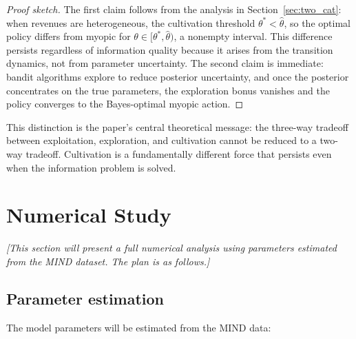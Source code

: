 \documentclass[11pt]{article}
\begin{document}
\begin{proof}[Proof sketch]
The first claim follows from the analysis in Section~\ref{sec:two_cat}: when revenues are heterogeneous, the cultivation threshold $\theta^* < \hat{\theta}$, so the optimal policy differs from myopic for $\theta \in [\theta^*, \hat{\theta})$, a nonempty interval. This difference persists regardless of information quality because it arises from the transition dynamics, not from parameter uncertainty. The second claim is immediate: bandit algorithms explore to reduce posterior uncertainty, and once the posterior concentrates on the true parameters, the exploration bonus vanishes and the policy converges to the Bayes-optimal myopic action.
\end{proof}

This distinction is the paper's central theoretical message: the three-way tradeoff between exploitation, exploration, and cultivation cannot be reduced to a two-way tradeoff. Cultivation is a fundamentally different force that persists even when the information problem is solved.

\section{Numerical Study}
\label{sec:numerical}

\textit{[This section will present a full numerical analysis using parameters estimated from the MIND dataset. The plan is as follows.]}

\subsection{Parameter estimation}

The model parameters will be estimated from the MIND data:
\end{document}
